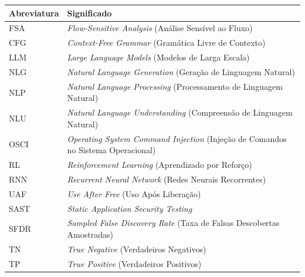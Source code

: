 \documentclass[
    12pt,                %
    openright,           %
    oneside,             %
    a4paper,             %
    english,             %
    brazil               %
]{abntex2}
\begin{document}
\begin{center}
\begin{tabular}{@{}p{3.2cm}p{}@{}}
\toprule
\textbf{Abreviatura} & \textbf{Significado} \\
\midrule
FSA  & \textit{Flow-Sensitive Analysis} (Análise Sensível ao Fluxo) \\
CFG  & \textit{Context-Free Grammar} (Gramática Livre de Contexto) \\
LLM  & \textit{Large Language Models} (Modelos de Larga Escala) \\
NLG  & \textit{Natural Language Generation} (Geração de Linguagem Natural) \\
NLP  & \textit{Natural Language Processing} (Processamento de Linguagem Natural) \\
NLU  & \textit{Natural Language Understanding} (Compreensão de Linguagem Natural) \\
OSCI & \textit{Operating System Command Injection} (Injeção de Comandos no Sistema Operacional) \\
RL   & \textit{Reinforcement Learning} (Aprendizado por Reforço) \\
RNN  & \textit{Recurrent Neural Network} (Redes Neurais Recorrentes) \\
UAF  & \textit{Use After Free} (Uso Após Liberação) \\
SAST & \textit{Static Application Security Testing} \\
SFDR & \textit{Sampled False Discovery Rate} (Taxa de Falsas Descobertas Amostradas) \\
TN   & \textit{True Negative} (Verdadeiros Negativos) \\
TP   & \textit{True Positive} (Verdadeiros Positivos) \\
\bottomrule
\end{tabular}
\end{center}

\cleardoublepage

\listoffigures*
\cleardoublepage

\tableofcontents*
\cleardoublepage
\textual
\end{document}
